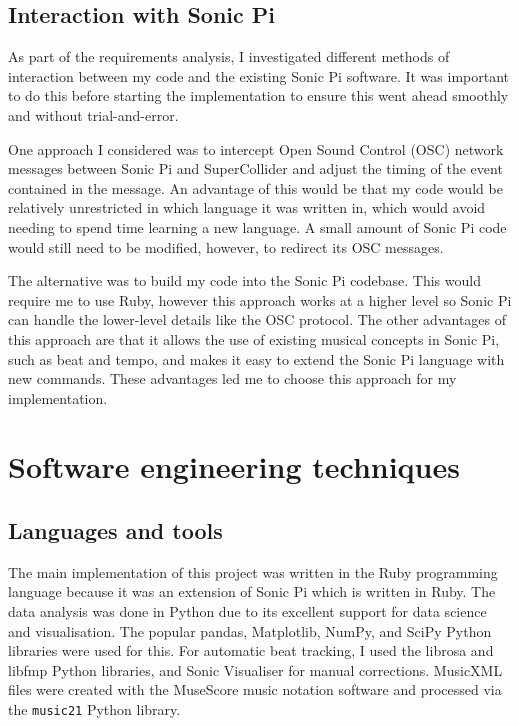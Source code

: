 \documentclass[12pt,twoside,openright]{report}
\begin{document}
\subsection{Interaction with Sonic Pi}

As part of the requirements analysis, I investigated different methods of
interaction between my code and the existing Sonic Pi software. It was important
to do this before starting the implementation to ensure this went ahead smoothly
and without trial-and-error.

One approach I considered was to intercept Open Sound Control (OSC) network
messages between Sonic Pi and SuperCollider and adjust the timing of the event
contained in the message. An advantage of this would be that my code would be relatively
unrestricted in which language it was written in, which would avoid needing to
spend time learning a new language. A small amount of Sonic Pi code would still
need to be modified, however, to redirect its OSC messages.

The alternative was to build my code into the Sonic Pi codebase. This would
require me to use Ruby, however this approach works at a higher level so Sonic Pi can
handle the lower-level details like the OSC protocol. The other advantages of this approach are
that it allows the use of existing musical concepts in Sonic Pi, such as beat and
tempo, and makes it easy to extend the Sonic Pi language with new commands.
These advantages led me to choose this approach for my implementation.



\section{Software engineering techniques} \label{software_engineering_techniques}

\subsection{Languages and tools} \label{languages_and_tools}

The main implementation of this project was written in the Ruby programming
language because it was an extension of Sonic Pi which is written in Ruby. The
data analysis was done in Python due to its excellent support for data science
and visualisation. The popular pandas, Matplotlib, NumPy, and SciPy Python
libraries were used for this. For automatic beat tracking, I used the librosa
and libfmp Python libraries, and Sonic Visualiser for manual corrections.
MusicXML files were created with the MuseScore music notation software and
processed via the \verb'music21' Python library.
\end{document}
